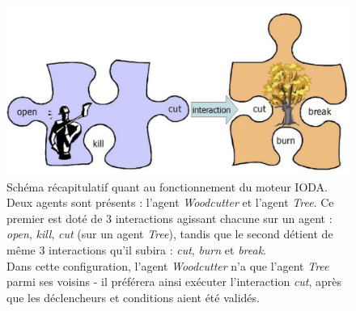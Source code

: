 \begin{figure}[h]
\begin{center}
\includegraphics[scale=0.43]{img/moteur_ioda_explications.png}
\end{center}
\caption{Schéma récapitulatif quant au fonctionnement du moteur IODA.\\Deux agents sont présents : l'agent \textit{Woodcutter} et l'agent \textit{Tree}. Ce premier est doté de 3 interactions agissant chacune sur un agent : \textit{open}, \textit{kill}, \textit{cut} (sur un agent \textit{Tree}), tandis que le second détient de même 3 interactions qu'il subira : \textit{cut}, \textit{burn} et \textit{break}.\\Dans cette configuration, l'agent \textit{Woodcutter} n'a que l'agent \textit{Tree} parmi ses voisins - il préférera ainsi exécuter l'interaction \textit{cut}, après que les déclencheurs et conditions aient été validés.}
\label{fig:moteur_ioda_explications}
\end{figure}